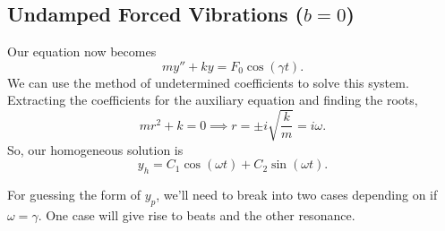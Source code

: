 \subsection{Undamped Forced Vibrations ($b = 0$)}
\noindent
Our equation now becomes
\begin{equation*}
	my'' + ky = F_0\cos{(\gamma t)}.
\end{equation*}
We can use the method of undetermined coefficients to solve this system.\\

\noindent
Extracting the coefficients for the auxiliary equation and finding the roots,
\begin{equation*}
	mr^2 + k = 0 \implies r = \pm i\sqrt{\frac{k}{m}} = i\omega.
\end{equation*}
So, our homogeneous solution is
\begin{equation*}
	y_h = C_1\cos{(\omega t)} + C_2\sin{(\omega t)}.
\end{equation*}

\noindent
For guessing the form of $y_p$, we'll need to break into two cases depending on if $\omega = \gamma$. One case will give rise to beats and the other resonance.


